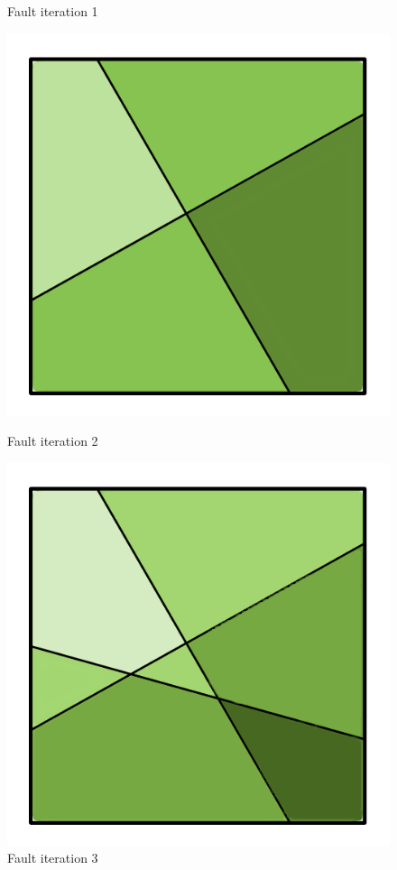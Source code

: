 \documentclass[11pt,a4paper,twoside,openright]{report}
\begin{document}
\begin{figure}[!htb]
  \caption{Fault iteration 1}\label{fig:fault1}
\endminipage\hfill
{}
  \includegraphics[width=\linewidth]{fault4.png}
  \caption{Fault iteration 2}\label{fig:fault2}
\endminipage\hfill
{}%
  \includegraphics[width=\linewidth]{fault6.png}
  \caption{Fault iteration 3}\label{fig:fault3}
\endminipage
\end{figure}
\end{document}
